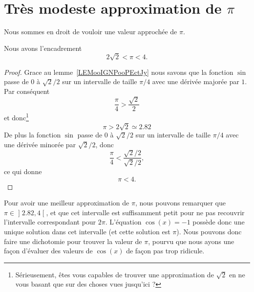 
\section{Très modeste approximation de \texorpdfstring{\(  \pi\)}{pi}}

Nous sommes en droit de vouloir une valeur approchée de \( \pi\).
\begin{lemma}       \label{LEMooJWSGooExmtDA}
	Nous avons l'encadrement
	\begin{equation}
		2\sqrt{ 2 }<\pi<4.
	\end{equation}
\end{lemma}

\begin{proof}
	Grace au lemme~\ref{LEMooIGNPooPEctJy} nous savons que la fonction \( \sin\) passe de \( 0\) à \( \sqrt{ 2 }/2\) sur un intervalle de taille \( \pi/4\) avec une dérivée majorée par \( 1\). Par conséquent
	\begin{equation}
		\frac{ \pi }{ 4 }>\frac{ \sqrt{ 2 } }{2}
	\end{equation}
	et donc\footnote{Sérieusement, êtes vous capables de trouver une approximation de \( \sqrt{ 2 }\) en ne vous basant que sur des choses vues jusqu'ici ?}
	\begin{equation}
		\pi>2\sqrt{ 2 }\simeq 2.82
	\end{equation}
	De plus la fonction \( \sin\) passe de \( 0\) à \( \sqrt{ 2 }/2\) sur un intervalle de taille \( \pi/4\) avec une dérivée minorée par \( \sqrt{ 2 }/2\), donc
	\begin{equation}
		\frac{ \pi }{ 4 }<\frac{ \sqrt{ 2 }/2 }{ \sqrt{ 2 }/2 },
	\end{equation}
	ce qui donne
	\begin{equation}
		\pi<4.
	\end{equation}
\end{proof}

Pour avoir une meilleur approximation de \( \pi\), nous pouvons remarquer que \( \pi\in\mathopen] 2.82 , 4 \mathclose[\), et que cet intervalle est suffisamment petit pour ne pas recouvrir l'intervalle correspondant pour \( 2\pi\). L'équation \( \cos(x)=-1\) possède donc une unique solution dans cet intervalle (et cette solution est \( \pi\)). Nous pouvons donc faire une dichotomie pour trouver la valeur de \( \pi\), pourvu que nous ayons une façon d'évaluer des valeurs de \( \cos(x)\) de façon pas trop ridicule.

